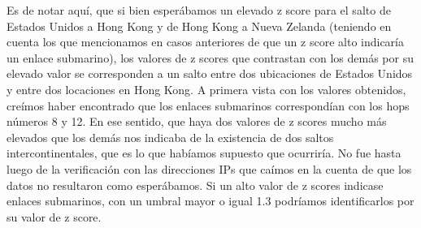 \indent Es de notar aquí, que si bien esperábamos un elevado z score para el salto de Estados Unidos a Hong Kong y de Hong Kong a Nueva Zelanda (teniendo en cuenta los que mencionamos en casos anteriores de que un z score alto indicaría un enlace submarino), los valores de z scores que contrastan con los demás por su elevado valor se corresponden a un salto entre dos ubicaciones de Estados Unidos y entre dos locaciones en Hong Kong. A primera vista con los valores obtenidos, creímos haber encontrado que los enlaces submarinos correspondían con los hops números 8 y 12. En ese sentido, que haya dos valores de z scores mucho más elevados que los demás nos indicaba de la existencia de dos saltos intercontinentales, que es lo que habíamos supuesto que ocurriría. No fue hasta luego de la verificación con las direcciones IPs que caímos en la cuenta de que los datos no resultaron como esperábamos. Si un alto valor de z scores indicase enlaces submarinos, con un umbral mayor o igual 1.3 podríamos identificarlos por su valor de z score.\\


